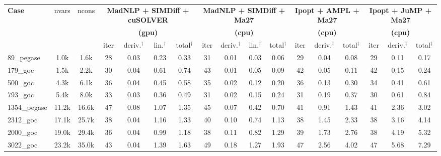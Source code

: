 \begin{tabular}{|l|c|c|cccc|cccc|ccc|ccc|}
  \hline
  \multirow{3}{*}{\textbf{Case}}
  & \multirow{3}{*}{nvars}
  & \multirow{3}{*}{ncons}
  & \multicolumn{4}{c|}{\textbf{MadNLP + SIMDiff + cuSOLVER}}
  & \multicolumn{4}{c|}{\textbf{MadNLP + SIMDiff + Ma27}}
  & \multicolumn{3}{c|}{\textbf{Ipopt + AMPL + Ma27}}
  & \multicolumn{3}{c|}{\textbf{Ipopt + JuMP + Ma27}}\\
  & & &\multicolumn{4}{c|}{\textbf{(gpu)}} &\multicolumn{4}{c|}{\textbf{(cpu)}} &\multicolumn{3}{c|}{\textbf{(cpu)}}&\multicolumn{3}{c|}{\textbf{(cpu)}}
  \\
  \cline{4-17}
  & & 
  & iter & deriv.$^\dag$ & lin.$^\dag$ & total$^\dag$
  & iter & deriv.$^\dag$ & lin.$^\dag$ & total$^\dag$
  & iter & deriv.$^\ddag$ & total$^\ddag$
  & iter & deriv.$^\ddag$ & total$^\ddag$
  \\
  \hline
89\_pegase 
&   1.0k
&   1.6k
& 28 
&  0.03
&  0.23
&  0.33
& 31 
&  0.01
&  0.03
&  0.06
& 29 
&  0.04
&  0.08
& 29 
&  0.11
&  0.17
\\

179\_goc 
&   1.5k
&   2.2k
& 30 
&  0.04
&  0.61
&  0.74
& 43 
&  0.01
&  0.05
&  0.09
& 42 
&  0.05
&  0.11
& 42 
&  0.15
&  0.24
\\

500\_goc 
&   4.3k
&   6.1k
& 36 
&  0.04
&  0.45
&  0.58
& 35 
&  0.02
&  0.12
&  0.20
& 36 
&  0.13
&  0.30
& 34 
&  0.41
&  0.61
\\

793\_goc 
&   5.4k
&   8.0k
& 33 
&  0.03
&  0.36
&  0.49
& 31 
&  0.02
&  0.15
&  0.24
& 31 
&  0.19
&  0.37
& 30 
&  0.61
&  0.84
\\

1354\_pegase 
&  11.2k
&  16.6k
& 47 
&  0.08
&  1.07
&  1.35
& 45 
&  0.07
&  0.42
&  0.70
& 41 
&  0.91
&  1.43
& 41 
&  2.36
&  3.02
\\
\hline
2312\_goc 
&  17.1k
&  25.7k
& 38 
&  0.04
&  1.16
&  1.33
& 40 
&  0.10
&  0.74
&  1.13
& 38 
&  1.45
&  2.33
& 38 
&  3.16
&  4.14
\\

2000\_goc 
&  19.0k
&  29.4k
& 36 
&  0.04
&  0.99
&  1.18
& 38 
&  0.11
&  0.82
&  1.29
& 39 
&  1.73
&  2.76
& 38 
&  4.19
&  5.32
\\

3022\_goc 
&  23.2k
&  35.0k
& 43 
&  0.04
&  1.39
&  1.63
& 49 
&  0.18
&  1.27
&  1.93
& 47 
&  2.56
&  4.02
& 47 
&  5.68
&  7.29
\\


\end{tabular}
